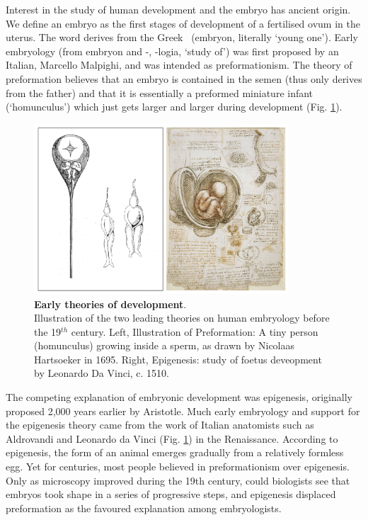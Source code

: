 Interest in the study of human development and the embryo has ancient origin.
We define an embryo as the first stages of development of a fertilised ovum in the uterus.
The word derives from the Greek \textepsilon\textmu\textbeta\textrho\textupsilon\textomikron\textnu \ (embryon, literally `young one').
Early embryology (from embryon and -\textlambda\textomikron\textgamma\textiota\textalpha, -logia, `study of') was first proposed by an Italian, Marcello Malpighi, and was intended as preformationism.
The theory of preformation believes that an embryo is contained in the semen (thus only derives from the father) and that it is essentially a preformed miniature infant (`homunculus') which just gets larger and larger during development (Fig. \ref{fig:early_embryology}).\\

\begin{figure}
\includegraphics[width=9.5cm]{Chapter1/Fig/Early_theories_development.png}
\caption[Early theories of development]{\textbf{Early theories of development}.\\
Illustration of the two leading theories on human embryology before the 19$^{th}$ century.
Left, Illustration of Preformation: 
A tiny person (homunculus) growing inside a sperm, as drawn by Nicolaas Hartsoeker in 1695.
Right, Epigenesis: study of foetus deveopment by Leonardo Da Vinci, c. 1510.}
\label{fig:early_embryology}
\end{figure}

The competing explanation of embryonic development was epigenesis, originally proposed 2,000 years earlier by Aristotle. 
Much early embryology and support for the epigenesis theory came from the work of Italian anatomists such as Aldrovandi and Leonardo da Vinci (Fig. \ref{fig:early_embryology}) in the Renaissance.
According to epigenesis, the form of an animal emerges gradually from a relatively formless egg. 
Yet for centuries, most people believed in preformationism over epigenesis.
Only as microscopy improved during the 19th century, could biologists see that embryos took shape in a series of progressive steps, and epigenesis displaced preformation as the favoured explanation among embryologists.\\

